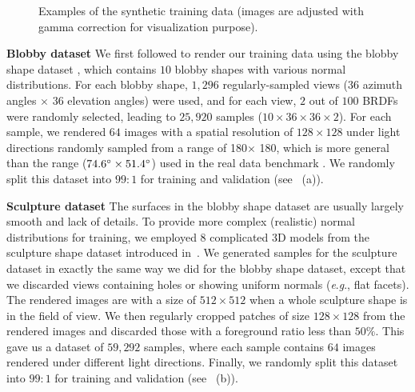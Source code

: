 \documentclass[10pt,journal,compsoc]{IEEEtran}
\newcommand{\eg}{\textit{e}.\textit{g}.}
\renewcommand{\paragraph}[1]{\vspace{0.2em}\noindent \textbf{#1 \hspace{0.2em}}}
\begin{document}
\begin{figure}[t] \centering
    
    \caption{Examples of the synthetic training data (images are adjusted with gamma correction for visualization purpose).} \label{fig:data_samples}
\end{figure}

\paragraph{Blobby dataset} We first followed \cite{santo2017deep} to render our training data using the blobby shape dataset \cite{johnson2011shape}, which contains $10$ blobby shapes with various normal distributions. For each blobby shape, $1,296$ regularly-sampled views ($36$ azimuth angles $\times$ $36$ elevation angles) were used, and for each view, $2$ out of $100$ BRDFs were randomly selected, leading to $25,920$ samples ($10\times 36\times 36\times 2$).
For each sample, we rendered $64$ images with a spatial resolution of $128 \times 128$ under light directions randomly sampled from a range of 180\degree $\times$ 180\degree, which is more general than the range ($74.6\degree \times 51.4\degree$) used in the real data benchmark \cite{shi2018benchmark}. We randomly split this dataset into $99:1$ for training and validation (see ~(a)).

\paragraph{Sculpture dataset} The surfaces in the blobby shape dataset are usually largely smooth and lack of details. To provide more complex (realistic) normal distributions for training, we employed $8$ complicated 3D models from the sculpture shape dataset introduced in~\cite{wiles2017silnet}. We generated samples for the sculpture dataset in exactly the same way we did for the blobby shape dataset, except that we discarded views containing holes or showing uniform normals (\eg, flat facets). 
The rendered images are with a size of $512 \times 512$ when a whole sculpture shape is in the field of view.
We then regularly cropped patches of size $128 \times 128$ from the rendered images and discarded those with a foreground ratio less than $50\%$.
This gave us a dataset of $59,292$ samples, where each sample contains $64$ images rendered under different light directions. Finally, we randomly split this dataset into $99:1$ for training and validation (see ~(b)).
\end{document}

